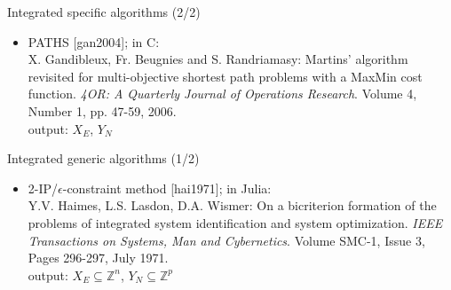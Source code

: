 \documentclass[10pt,xcolor=dvipsnames]{beamer}
\newcommand{\grey}{\textcolor{black!25}}
\newcommand{\Z}{\mathbb{Z}}
\begin{document}
\begin{frame}{Integrated specific algorithms (2/2)}
{\begin{itemize}
\item \grey{ PATHS [gan2004]; in C:\vspace{1mm}\\      
         {\tiny X. Gandibleux, Fr. Beugnies and S. Randriamasy:
         Martins' algorithm revisited for multi-objective shortest path problems with a MaxMin cost function.
         \textit{4OR: A Quarterly Journal of Operations Research}.
         Volume 4, Number 1, pp. 47-59, 2006. \\}
         output: $X_E$, $Y_N$
         }
                  
\end{itemize}
}
\end{frame}

%
% 
\begin{frame}{Integrated generic algorithms (1/2)}

{\small
\begin{itemize}
\item 2-IP/$\epsilon$-constraint method [hai1971]; in Julia:\vspace{1mm}\\
         {\tiny Y.V. Haimes, L.S. Lasdon, D.A. Wismer: On a bicriterion formation of the problems of integrated system identification and system optimization. 
         \textit{IEEE Transactions on Systems, Man and Cybernetics}.
         Volume SMC-1, Issue 3, Pages 296-297, July 1971.\\}
         output: $X_E \subseteq \Z^n$, $Y_N \subseteq \Z^p$
         \medskip
     

\end{itemize}}
\end{frame}
\end{document}
